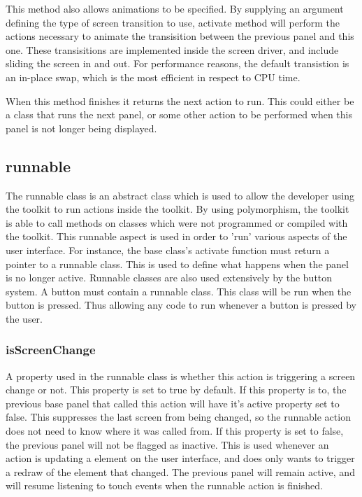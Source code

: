 This method also allows animations to be specified. By supplying an argument defining the type of screen transition to use, activate method will perform the actions necessary to animate the transisition between the previous panel and this one. These transisitions are implemented inside the screen driver, and include sliding the screen in and out. For performance reasons, the default transistion is an in-place swap, which is the most efficient in respect to CPU time.

When this method finishes it returns the next action to run. This could either be a class that runs the next panel, or some other action to be performed when this panel is not longer being displayed.

\subsection{runnable}
\label{sec:runnable}

The runnable class is an abstract class which is used to allow the developer using the toolkit to run actions inside the toolkit. By using polymorphism, the toolkit is able to call methods on classes which were not programmed or compiled with the toolkit. This runnable aspect is used in order to 'run' various aspects of the user interface. For instance, the base class's activate function must return a pointer to a runnable class. This is used to define what happens when the panel is no longer active. Runnable classes are also used extensively by the button system. A button must contain a runnable class. This class will be run when the button is pressed. Thus allowing any code to run whenever a button is pressed by the user. 

\subsubsection{isScreenChange}

A property used in the runnable class is whether this action is triggering a screen change or not. This property is set to true by default. If this property is to, the previous base panel that called this action will have it's active property set to false. This suppresses the last screen from being changed, so the runnable action does not need to know where it was called from. If this property is set to false, the previous panel will not be flagged as inactive. This is used whenever an action is updating a element on the user interface, and does only wants to trigger a redraw of the element that changed. The previous panel will remain active, and will resume listening to touch events when the runnable action is finished.

